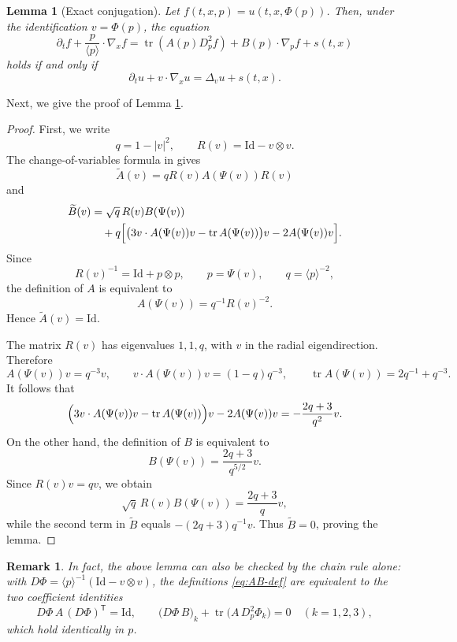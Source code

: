 \documentclass[10pt,a4paper]{amsart}
\numberwithin{equation}{section}
\newtheorem{lemma}[theorem]{Lemma}
\newtheorem{remark}[theorem]{Remark}
\DeclareMathOperator{\tr}{tr}
\newcommand{\Id}{\mathrm{Id}}
\newcommand{\la}[1]{\langle #1\rangle}
\begin{document}
\begin{lemma}[Exact conjugation]\label{lem:conjugation}
Let $f(t,x,p)=u(t,x,\Phi(p))$.  Then, under the identification $v=\Phi(p)$, the equation
\begin{equation}\label{eq:exact-conj}
   \partial_t f+\frac{p}{\la p}\cdot\nabla_xf
   =\tr(A(p)D_p^2f)+B(p)\cdot\nabla_pf+s(t,x)
\end{equation}
holds if and only if
\begin{equation}\label{eq:kolmo}
   \partial_tu+v\cdot\nabla_xu=\Delta_vu+s(t,x).
\end{equation}
\end{lemma}
Next, we give the proof of Lemma \ref{lem:conjugation}.
\begin{proof}
First, we write
\[
   q=1-|v|^2,
   \qquad
   R(v)=\Id-v\otimes v.
\]
The change-of-variables formula in \cite[Lemma~6.3]{HSTT} gives
\[
   \widetilde A(v)=qR(v)A(\Psi(v))R(v)
\]
and
\[
\begin{aligned}
   \widetilde B(v)
   &=\sqrt q\,R(v)B(\Psi(v)) \\
   &\quad+q\Bigl[\bigl(3v\cdot A(\Psi(v))v-\tr A(\Psi(v))\bigr)v
          -2A(\Psi(v))v\Bigr].
\end{aligned}
\]
Since
\[
   R(v)^{-1}=\Id+p\otimes p,
   \qquad p=\Psi(v),
   \qquad q=\la p^{-2},
\]
the definition of $A$ is equivalent to
\[
   A(\Psi(v))=q^{-1}R(v)^{-2}.
\]
Hence $\widetilde A(v)=\Id$.

The matrix $R(v)$ has eigenvalues $1,1,q$, with $v$ in the radial eigendirection.  Therefore
\[
   A(\Psi(v))v=q^{-3}v,
   \qquad
   v\cdot A(\Psi(v))v=(1-q)q^{-3},
   \qquad
   \tr A(\Psi(v))=2q^{-1}+q^{-3}.
\]
It follows that
\[
   \Bigl(3v\cdot A(\Psi(v))v-\tr A(\Psi(v))\Bigr)v
   -2A(\Psi(v))v
   =-\frac{2q+3}{q^2}v.
\]
On the other hand, the definition of $B$ is equivalent to
\[
   B(\Psi(v))=\frac{2q+3}{q^{5/2}}v.
\]
Since $R(v)v=qv$, we obtain
\[
   \sqrt q\,R(v)B(\Psi(v))=\frac{2q+3}{q}v,
\]
while the second term in $\widetilde B$ equals $-(2q+3)q^{-1}v$.  Thus
$\widetilde B=0$, proving the lemma.
\end{proof}

\begin{remark}\label{rem:direct}
In fact, the above lemma can also be checked by the chain rule alone: with $D\Phi=\la p^{-1}(\Id-v\otimes v)$, the definitions \eqref{eq:AB-def} are equivalent to the two coefficient identities
\[
   D\Phi\,A\,(D\Phi)^{\mathsf T}=\Id,
   \qquad
   \bigl(D\Phi\,B\bigr)_k+\tr\!\bigl(A\,D_p^2\Phi_k\bigr)=0
   \quad(k=1,2,3),
\]
which hold identically in $p$.
\end{remark}
\end{document}
